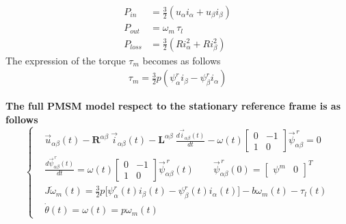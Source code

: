 \documentclass[11pt,a4paper]{article}
\numberwithin{equation}{section}
\theoremstyle{it}
\theoremstyle{definition}
\begin{document}
\begin{onehalfspace}
\begin{equation*}
	\begin{aligned}
		P_{in} &= \frac{3}{2}\left( u_\alpha i_\alpha+u_\beta i_\beta\right)  \\[6pt]
		P_{out} &= \omega_m\,\tau_l \\[6pt]
		P_{loss} &= \frac{3}{2}\left( Ri_\alpha^2+Ri_\beta^2\right) 
	\end{aligned} 
\end{equation*}
The expression of the torque $\tau_m$ becomes as follows
\begin{equation}
	\begin{aligned}
		\tau_m = \frac{3}{2}p\left( \psi^r_{\alpha}i_{\beta}-\psi^r_{\beta}i_{\alpha}\right) 
	\end{aligned} 
\end{equation}

\begin{mybox}
	\textbf{The full PMSM model respect to the stationary reference frame is as follows}
	\begin{equation}\label{twophase_model_ref}
		\left\lbrace \begin{aligned}
			& \vec{u}_{\alpha\beta}(t)-\mathbf{R}^{\alpha\beta}\ \vec{i}_{\alpha\beta}(t)-\mathbf{L}^{\alpha\beta}\ \frac{d\vec{i}_{\alpha\beta}(t)}{dt}-\omega(t) \begin{bmatrix} 0 & -1 \\ 1 & 0\end{bmatrix} \vec{\psi}^{\,r}_{\alpha\beta} = 0 \\[6pt]
			& \frac{d\vec{\psi}^{\,r}_{\alpha\beta}(t)}{dt} = \omega(t) \begin{bmatrix} 0 & -1 \\ 1 & 0\end{bmatrix} \vec{\psi}^{\,r}_{\alpha\beta}(t) \qquad \vec{\psi}^{\,r}_{\alpha\beta}(0) = \begin{bmatrix} \psi^m &  0 \end{bmatrix}^T \\[6pt]
			& J\dot{\omega}_m(t) = \frac{3}{2}p\Big[\psi^r_{\alpha}(t)i_{\beta}(t)-\psi^r_{\beta}(t)i_{\alpha}(t)\Big]-b\omega_m(t) -\tau_l(t) \\[6pt]
			& \dot{\theta}(t) = \omega(t) = p\omega_m(t)
		\end{aligned} \right. 
	\end{equation}
\end{mybox}


\end{onehalfspace}
\end{document}
